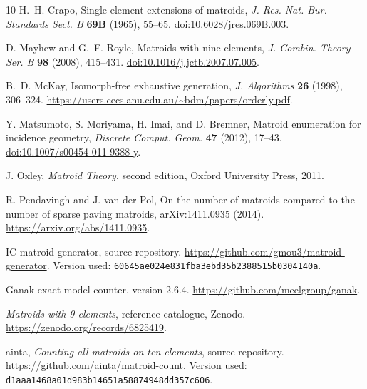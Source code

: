 \documentclass[11pt]{article}
\theoremstyle{definition}
\begin{document}
\begin{thebibliography}{10}
\small
{}
H.~H. Crapo,
Single-element extensions of matroids,
\emph{J. Res. Nat. Bur. Standards Sect. B} \textbf{69B} (1965), 55--65.
\href{https://doi.org/10.6028/jres.069B.003}{doi:10.6028/jres.069B.003}.

D. Mayhew and G.~F. Royle,
Matroids with nine elements,
\emph{J. Combin. Theory Ser. B} \textbf{98} (2008), 415--431.
\href{https://doi.org/10.1016/j.jctb.2007.07.005}{doi:10.1016/j.jctb.2007.07.005}.

B.~D. McKay,
Isomorph-free exhaustive generation,
\emph{J. Algorithms} \textbf{26} (1998), 306--324.
\url{https://users.cecs.anu.edu.au/~bdm/papers/orderly.pdf}.

Y. Matsumoto, S. Moriyama, H. Imai, and D. Bremner,
Matroid enumeration for incidence geometry,
\emph{Discrete Comput. Geom.} \textbf{47} (2012), 17--43.
\href{https://doi.org/10.1007/s00454-011-9388-y}{doi:10.1007/s00454-011-9388-y}.

J. Oxley,
\emph{Matroid Theory}, second edition,
Oxford University Press, 2011.

R. Pendavingh and J. van der Pol,
On the number of matroids compared to the number of sparse paving matroids,
arXiv:1411.0935 (2014).
\url{https://arxiv.org/abs/1411.0935}.

IC matroid generator, source repository.
\url{https://github.com/gmou3/matroid-generator}.
Version used: \texttt{60645ae024e831fba3ebd35b2388515b0304140a}.

Ganak exact model counter, version 2.6.4.
\url{https://github.com/meelgroup/ganak}.

\emph{Matroids with 9 elements}, reference catalogue, Zenodo.
\url{https://zenodo.org/records/6825419}.

ainta, \emph{Counting all matroids on ten elements}, source repository.
\url{https://github.com/ainta/matroid-count}.
Version used: \texttt{d1aaa1468a01d983b14651a58874948dd357c606}.
\end{thebibliography}
\end{document}
